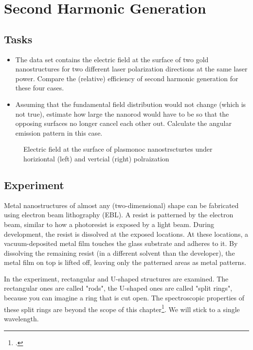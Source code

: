 \renewcommand{\lastmod}{June 11, 2024}
\renewcommand{\chapterauthors}{Markus Lippitz}


\chapter{Second Harmonic Generation}


\section{Tasks}

\begin{itemize}
\item The data set contains the electric field at the surface of two gold nanostructures for two different laser polarization directions at the same laser power. Compare the (relative)  efficiency of second harmonic generation for these four cases.

\item Assuming that the fundamental field distribution would not change (which is not true), estimate how large the nanorod would have to be so that the opposing surfaces no longer cancel each other out. Calculate the angular emission pattern in this case.
\end{itemize}

\begin{figure}
  \caption{Electric field at the surface of plasmonoc nanostrscturtes under horiziontal (left) and vertcial (right) polraization }
\end{figure}

\section{Experiment}

Metal nanostructures of almost any (two-dimensional) shape can be fabricated using electron beam lithography (EBL). A resist is patterned by the electron beam, similar to how a photoresist is exposed by a light beam. During development, the resist is dissolved at the exposed locations. At these locations, a vacuum-deposited metal film touches the glass substrate and adheres to it. By dissolving the remaining resist (in a different solvent than the developer), the metal film on top is lifted off, leaving only the patterned areas as metal patterns.

In the experiment, rectangular and U-shaped structures are examined. The rectangular ones are called "rods", the U-shaped ones are called "split rings", because you can imagine a ring that is cut open. The spectroscopic properties of these split rings are beyond the scope of this chapter\footcite{klein06_science}. We will stick to a single wavelength.


